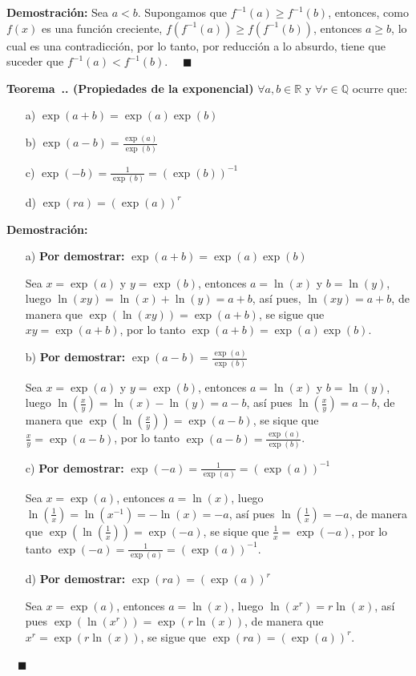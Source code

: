 \documentclass{article}
\numberwithin{equation}{section}
\newcommand{\Col}{\color{ProcessBlue}}
\newcounter{theorem}[section]
\newenvironment
{theorem}[1][]
{\vspace{0.5cm}\refstepcounter{theorem}\par\medskip\noindent\textbf{\Col Teorema~\thesection.\thetheorem. #1}\rmfamily}
{}
\newenvironment
{proof}
{\par\medskip\noindent\textbf{Demostración:}\rmfamily}
{\Col\hfill$\quad \blacksquare$\vspace{0.5cm}}
\begin{document}
\begin{proof}
    Sea $a<b$. Supongamos que $f^{-1}(a)\geq f^{-1}(b)$, entonces, como $f(x)$ es una función creciente, $f(f^{-1}(a))\geq f(f^{-1}(b))$, entonces $a\geq b$, lo cual es una contradicción, por lo tanto, por reducción a lo absurdo, tiene que suceder que $f^{-1}(a)<f^{-1}(b)$.
\end{proof}

\begin{theorem}[(Propiedades de la exponencial)]
    $\forall a,b\in\mathbb{R}$ y $\forall r\in\mathbb{Q}$ ocurre que:
    \begin{enumerate}
        \item[a)] $\exp(a+b)=\exp(a)\exp(b)$
        \item[b)] $\exp(a-b)=\frac{\exp(a)}{\exp(b)}$
        \item[c)] $\exp(-b)=\frac{1}{\exp(b)}=(\exp(b))^{-1}$
        \item[d)] $\exp(ra)=(\exp(a))^r$
    \end{enumerate}
\end{theorem}

\begin{proof}
    \begin{enumerate}
        \item[a)] \textbf{Por demostrar:} $\exp(a+b)=\exp(a)\exp(b)$
        
        Sea $x=\exp(a)$ y $y=\exp(b)$, entonces $a=\ln(x)$ y $b=\ln(y)$, luego $\ln(xy)=\ln(x)+\ln(y)=a+b$, 
        así pues, $\ln(xy)=a+b$, de manera que $\exp(\ln(xy))=\exp(a+b)$, se sigue que $xy=\exp(a+b)$, por lo tanto $\exp(a+b)=\exp(a)\exp(b)$.
        
        \item[b)] \textbf{Por demostrar:} $\exp(a-b)=\frac{\exp(a)}{\exp(b)}$
        
        Sea $x=\exp(a)$ y $y=\exp(b)$, entonces $a=\ln(x)$ y $b=\ln(y)$, luego $\ln\left(\frac{x}{y}\right)=\ln(x)-\ln(y)=a-b$, así pues $\ln\left(\frac{x}{y}\right)=a-b$, de manera que $\exp\left(\ln\left(\frac{x}{y}\right)\right)=\exp(a-b)$, se sique que $\frac{x}{y}=\exp(a-b)$, por lo tanto $\exp(a-b)=\frac{\exp(a)}{\exp(b)}$.
        
        \item[c)] \textbf{Por demostrar:} $\exp(-a)=\frac{1}{\exp(a)}=(\exp(a))^{-1}$
        
        Sea $x=\exp(a)$, entonces $a=\ln(x)$, luego $\ln\left(\frac{1}{x}\right)=\ln(x^{-1})=-\ln(x)=-a$, así pues $\ln\left(\frac{1}{x}\right)=-a$, de manera que $\exp\left(\ln\left(\frac{1}{x}\right)\right)=\exp(-a)$, se sique que $\frac{1}{x}=\exp(-a)$, por lo tanto $\exp(-a)=\frac{1}{\exp(a)}=(\exp(a))^{-1}$.
        
        \item[d)] \textbf{Por demostrar:} $\exp(ra)=(\exp(a))^r$
        
        Sea $x=\exp(a)$, entonces $a=\ln(x)$, luego $\ln(x^r)=r\ln(x)$, así pues $\exp(\ln(x^r))=\exp(r\ln(x))$, de manera que $x^r=\exp(r\ln(x))$, se sigue que $\exp(ra)=(\exp(a))^{r}$.
        
    \end{enumerate}
\end{proof}
\end{document}
